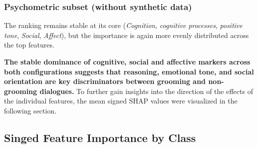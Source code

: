 \subsubsection{Psychometric subset (without synthetic data)}
The ranking remains stable at its core (\textit{Cognition}, \textit{cognitive processes}, \textit{positive tone}, \textit{Social},  \textit{Affect}), but the importance is again more evenly distributed across the top features. 

\textbf{The stable dominance of cognitive, social and affective markers across both configurations suggests that reasoning, emotional tone, and social orientation are key discriminators between grooming and non-grooming dialogues.} To further gain insights into the direction of the effects of the individual features, the mean signed SHAP values were visualized in the following section.
\subsection{Singed Feature Importance by Class}


